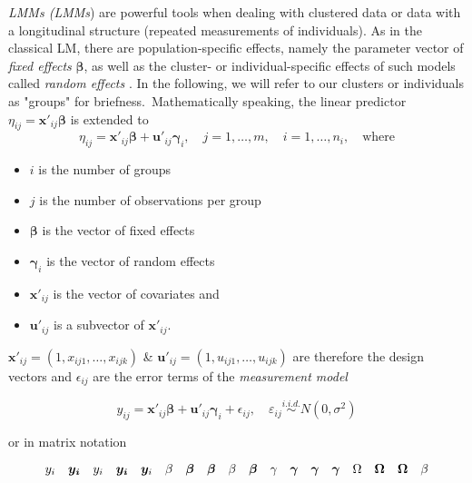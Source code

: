 \textit{\acl{LMM}s (\acs{LMM}s}) are powerful tools when dealing with clustered data or data with a longitudinal structure (repeated measurements of individuals).
As in the classical \acs{LM}, there are population-specific effects, namely the parameter vector of \textit{fixed effects} $\boldsymbol{\beta}$, as well as the cluster- or individual-specific effects of such models called \textit{random effects} \cite{fahrmeir2003regression}. In the following, we will refer to our clusters or individuals as "groups" for briefness.\ Mathematically speaking, the linear predictor $\eta_{ij}= \mathbf{x}'_{ij} \mathbf{\beta} $ is extended to
$$\eta_{ij} = \mathbf{{x'}}_{ij} \mathbf{\beta} + \mathbf{u'}_{ij}\mathbf{\gamma}_i, \quad j=1, \ldots, m, \quad i=1, \ldots, n_i, \quad \text{where}$$
\begin{itemize}
\item $i$ is the number of groups
\item $j$ is the number of observations per group
\item $\bm{\beta}$ is the vector of fixed effects
\item $\bm{\gamma}_i$ is the vector of random effects
\item $\mathbf{x'}_{ij}$ is the vector of covariates and
\item $\mathbf{u'}_{ij}$ is a subvector of $\mathbf{x'}_{ij}$.
\end{itemize}
$\mathbf{x'}_{ij} = (1, x_{ij1}, \ldots, x_{ijk}) $ \& $ \mathbf{u'}_{ij} = (1, u_{ij1}, \ldots, u_{ijk}) $ are therefore the design vectors and $\epsilon_{ij}$ are the error terms of the \textit{measurement model}

\begin{equation}
y_{ij} =  \mathbf{x'}_{ij} \mathbf{\beta} + \mathbf{u'}_{ij} \mathbf{\gamma}_i + \epsilon_{ij}, \quad \varepsilon_{i j} \overset{i.i.d.} \sim N\left(0, \sigma^{2}\right) 
\end{equation}

or in matrix notation

$$
y_i \quad
\bm{y_i} \quad
\boldmath{y_i} \quad
\mathbf{y_i} \quad
\mathbf{y}_i \quad
\beta \quad
\bm{\beta} \quad
\boldsymbol{\beta} \quad
\boldmath{\beta} \quad
\vb{\beta} \quad
\gamma \quad
\mathbf{\gamma} \quad
\bm{\gamma} \quad
\boldsymbol{\gamma} \quad
\Omega \quad
\mathbf{\Omega} \quad
\bm{\Omega} \quad
\boldmath{\beta}
$$


